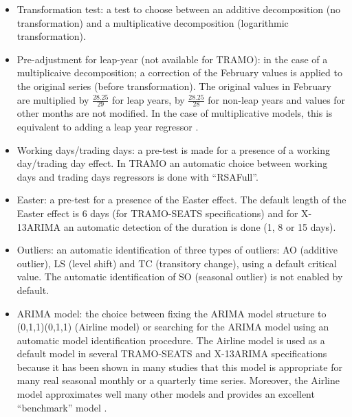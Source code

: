 \documentclass[article]{jss}
\providecommand{\tightlist}{%
  \setlength{\itemsep}{0pt}\setlength{\parskip}{0pt}}
\begin{document}
\begin{itemize}
\tightlist
\item
  Transformation test: a test to choose between an additive
  decomposition (no transformation) and a multiplicative decomposition
  (logarithmic transformation).\\
\item
  Pre-adjustment for leap-year (not available for TRAMO): in the case of
  a multiplicaive decomposition; a correction of the February values is
  applied to the original series (before transformation). The original
  values in February are multiplied by \(\frac{28.25}{29}\) for leap
  years, by \(\frac{28.25}{28}\) for non-leap years and values for other
  months are not modified. In the case of multiplicative models, this is
  equivalent to adding a leap year regressor
  \citep{bell1992lengthmonthadj}.\\
\item
  Working days/trading days: a pre-test is made for a presence of a
  working day/trading day effect. In TRAMO an automatic choice between
  working days and trading days regressors is done with ``RSAFull''.\\
\item
  Easter: a pre-test for a presence of the Easter effect. The default
  length of the Easter effect is 6 days (for TRAMO-SEATS specifications)
  and for X-13ARIMA an automatic detection of the duration is done (1, 8
  or 15 days).\\
\item
  Outliers: an automatic identification of three types of outliers: AO
  (additive outlier), LS (level shift) and TC (transitory change), using
  a default critical value. The automatic identification of SO (seasonal
  outlier) is not enabled by default.\\
\item
  ARIMA model: the choice between fixing the ARIMA model structure to
  (0,1,1)(0,1,1) (Airline model) or searching for the ARIMA model using
  an automatic model identification procedure. The Airline model is used
  as a default model in several TRAMO-SEATS and X-13ARIMA specifications
  because it has been shown in many studies that this model is
  appropriate for many real seasonal monthly or a quarterly time series.
  Moreover, the Airline model approximates well many other models and
  provides an excellent ``benchmark'' model
  \citep{maravall2009identification}.
\end{itemize}
\end{document}
